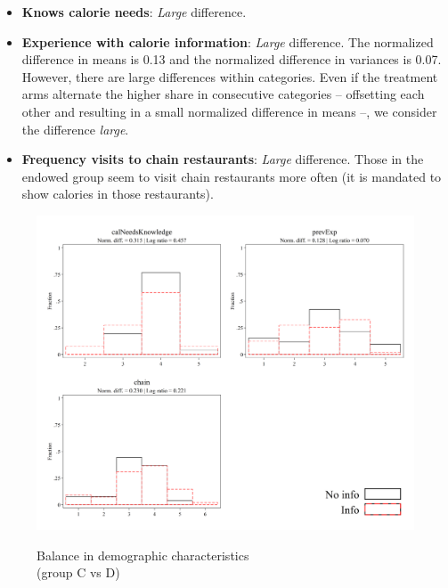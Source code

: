 \documentclass[12pt]{article}
\begin{document}
\begin{itemize}
  \item \textbf{Knows calorie needs}: \emph{Large} difference.

  \item \textbf{Experience with calorie information}: \emph{Large} difference.
  The normalized difference in means is 0.13 and the normalized difference in variances is 0.07. However, there are large differences within categories. Even if the treatment arms alternate the higher share in consecutive categories – offsetting each other and resulting in a small normalized difference in means –, we consider the difference \emph{large}.

  \item \textbf{Frequency visits to chain restaurants}: \emph{Large} difference.
  Those in the endowed group seem to visit chain restaurants more often (it is mandated to show calories in those restaurants).
\end{itemize}

\begin{figure}[ht]
  \caption{Balance in demographic characteristics \\ (group C vs D)}\label{fig:group3_calorie}
  \begin{center}
  {\includegraphics[width=1\textwidth]{./figures/covDifTreat_1_calorieKnow.png}}
  \end{center}
\end{figure}

\FloatBarrier
\end{document}
